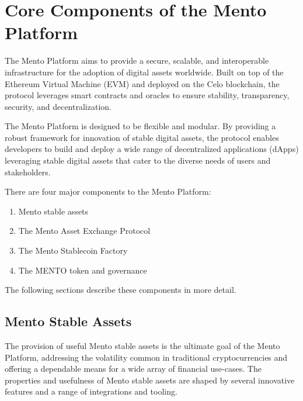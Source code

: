 \documentclass[a4paper]{article}
\theoremstyle{definition}
\begin{document}
\section{Core Components of the Mento Platform}
\label{sec:core_components}
The Mento Platform aims to provide a secure, scalable, and interoperable infrastructure for the adoption of digital assets worldwide. Built on top of the Ethereum Virtual Machine (EVM) and deployed on the Celo blockchain, the protocol leverages smart contracts and oracles to ensure stability, transparency, security, and decentralization.

The Mento Platform is designed to be flexible and modular. By providing a robust framework for innovation of stable digital assets, the protocol enables developers to build and deploy a wide range of decentralized applications (dApps) leveraging stable digital assets that cater to the diverse needs of users and stakeholders.

There are four major components to the Mento Platform:
\begin{enumerate}
    \item Mento stable assets
    \item The Mento Asset Exchange Protocol
    \item The Mento Stablecoin Factory
    \item The MENTO token and governance 
\end{enumerate}

The following sections describe these components in more detail.

\subsection{Mento Stable Assets}
The provision of useful Mento stable assets is the ultimate goal of the Mento Platform, addressing the volatility common in traditional cryptocurrencies and offering a dependable means for a wide array of financial use-cases. The properties and usefulness of Mento stable assets are shaped by several innovative features and a range of integrations and tooling.
\end{document}
